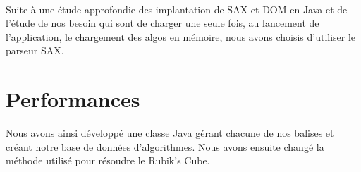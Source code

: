 ~

Suite à une étude approfondie des implantation de SAX et DOM en Java et de l'étude de nos besoin qui sont de charger une seule fois, au lancement de l'application, le chargement des algos en mémoire, nous avons choisis d'utiliser le parseur SAX.

\section{Performances}

Nous avons ainsi développé une classe Java gérant chacune de nos balises et créant notre base de données d'algorithmes. Nous avons ensuite changé la méthode utilisé pour résoudre le Rubik's Cube.

